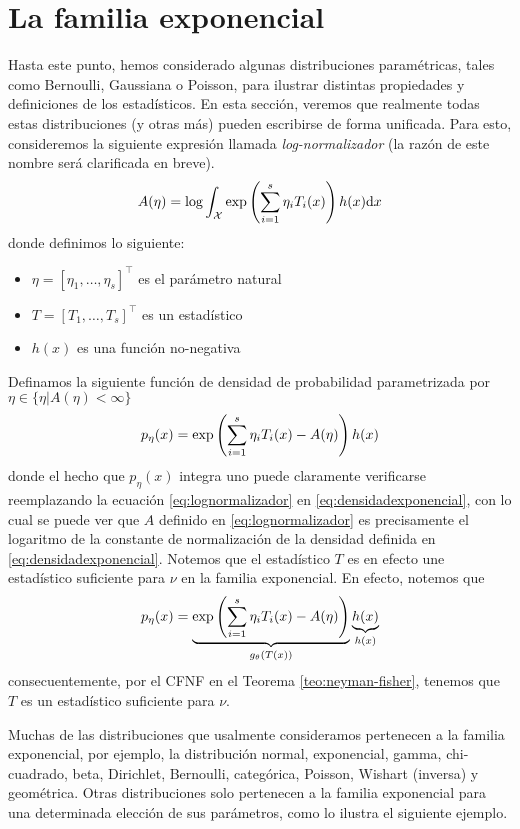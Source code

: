 \section{La familia exponencial}

Hasta este punto, hemos considerado algunas distribuciones paramétricas, tales como Bernoulli, Gaussiana o Poisson, para ilustrar distintas propiedades y definiciones de los estadísticos. En esta sección, veremos que realmente todas estas distribuciones (y otras más) pueden escribirse de forma unificada. Para esto, consideremos la siguiente expresión llamada \textit{log-normalizador} (la razón de este nombre será clarificada en breve).
\begin{equation}
	\label{eq:lognormalizador}
	A(\eta) = \log\int_{\mathcal X} \exp\left(\sum_{i=1}^s\eta_iT_i(x)\right)h(x){\text{d}x}
\end{equation}
donde definimos lo siguiente:
\begin{itemize}
	\item $\eta = [\eta_1,\ldots,\eta_s]^\top$ es el parámetro natural
	\item $T = [T_1,\ldots,T_s]^\top$ es un estadístico
	\item $h(x)$ es una función no-negativa
\end{itemize}
Definamos la siguiente función de densidad de probabilidad parametrizada por $\eta\in\{\eta | A(\eta)<\infty\}$
\begin{equation}
	\label{eq:densidadexponencial}
 	p_\eta(x) = \exp\left(\sum_{i=1}^s\eta_iT_i(x)-A(\eta)\right)h(x)
 \end{equation} 
 donde el hecho que $p_\eta(x)$ integra uno puede claramente verificarse reemplazando la ecuación \eqref{eq:lognormalizador} en \eqref{eq:densidadexponencial}, con lo cual se puede ver que $A$ definido en \eqref{eq:lognormalizador} es precisamente el logaritmo de la constante de normalización de la densidad definida en \eqref{eq:densidadexponencial}.
 Notemos que el estadístico $T$ es en efecto une estadístico suficiente para $\nu$ en la familia exponencial. En efecto, notemos que 
 \begin{equation}
	\label{eq:densidadexponencial2}
 	p_\eta(x) = \underbrace{\exp\left(\sum_{i=1}^s\eta_iT_i(x)-A(\eta)\right)}_{g_\theta(T(x))}\underbrace{h(x)}_{h(x)}
 \end{equation} 
consecuentemente, por el CFNF en el Teorema \ref{teo:neyman-fisher}, tenemos que $T$ es 
un estadístico suficiente para $\nu$.

Muchas de las distribuciones que usalmente consideramos pertenecen a la familia exponencial, por ejemplo, la distribución normal, exponencial, gamma, chi-cuadrado, beta, Dirichlet, Bernoulli, categórica, Poisson, Wishart (inversa) y geométrica. Otras distribuciones solo pertenecen a la familia exponencial para una determinada elección de sus parámetros, como lo ilustra el siguiente ejemplo.

